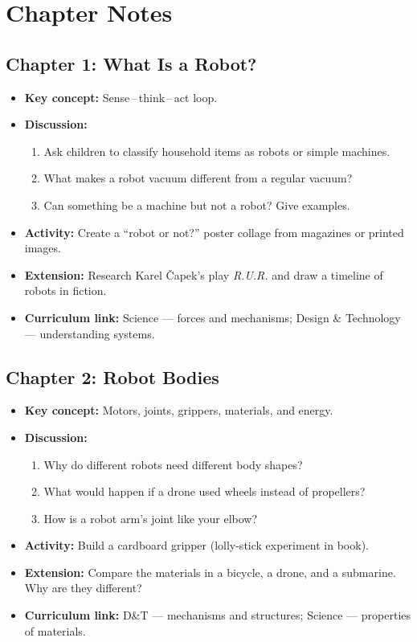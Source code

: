 \sectionrule

\section*{Chapter Notes}

\subsection*{Chapter 1: What Is a Robot?}
\begin{itemize}
  \item \textbf{Key concept:} Sense\,--\,think\,--\,act loop.
  \item \textbf{Discussion:}
    \begin{enumerate}
      \item Ask children to classify household items as robots or simple machines.
      \item What makes a robot vacuum different from a regular vacuum?
      \item Can something be a machine but not a robot? Give examples.
    \end{enumerate}
  \item \textbf{Activity:} Create a ``robot or not?'' poster collage from magazines or printed images.
  \item \textbf{Extension:} Research Karel \v{C}apek's play \emph{R.U.R.} and draw a timeline of robots in fiction.
  \item \textbf{Curriculum link:} Science --- forces and mechanisms; Design \& Technology --- understanding systems.
\end{itemize}

\subsection*{Chapter 2: Robot Bodies}
\begin{itemize}
  \item \textbf{Key concept:} Motors, joints, grippers, materials, and energy.
  \item \textbf{Discussion:}
    \begin{enumerate}
      \item Why do different robots need different body shapes?
      \item What would happen if a drone used wheels instead of propellers?
      \item How is a robot arm's joint like your elbow?
    \end{enumerate}
  \item \textbf{Activity:} Build a cardboard gripper (lolly-stick experiment in book).
  \item \textbf{Extension:} Compare the materials in a bicycle, a drone, and a submarine. Why are they different?
  \item \textbf{Curriculum link:} D\&T --- mechanisms and structures; Science --- properties of materials.
\end{itemize}

